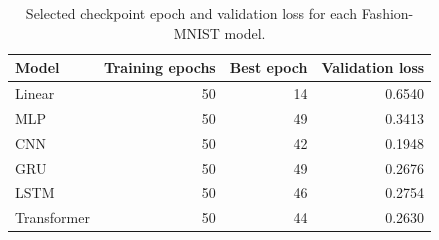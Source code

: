 \begin{table}[htbp]
\centering\small
\caption{Selected checkpoint epoch and validation loss for each Fashion-MNIST model.}
\label{tab:checkpoints}
\begin{tabular}{lrrr}
\toprule
Model & Training epochs & Best epoch & Validation loss\\\midrule
Linear & 50 & 14 & 0.6540\\
MLP & 50 & 49 & 0.3413\\
CNN & 50 & 42 & 0.1948\\
GRU & 50 & 49 & 0.2676\\
LSTM & 50 & 46 & 0.2754\\
Transformer & 50 & 44 & 0.2630\\
\bottomrule
\end{tabular}
\end{table}
